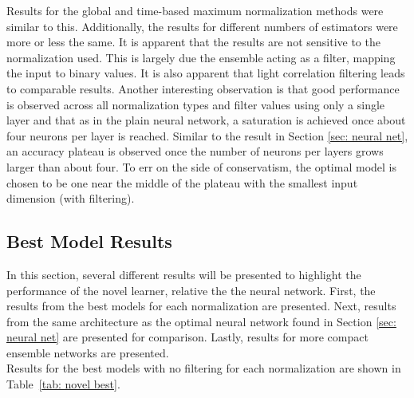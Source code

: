 \documentclass[paper=a4, fontsize=11pt]{scrartcl} %
\begin{document}
Results for the global and time-based maximum normalization methods were similar to this.
Additionally, the results for different numbers of estimators were more or less the same.
It is apparent that the results are not sensitive to the normalization used.
This is largely due the ensemble acting as a filter, mapping the input to binary values.
It is also apparent that light correlation filtering leads to comparable results.
Another interesting observation is that good performance is observed across all normalization types and filter values using only a single layer and that as in the plain neural network, a saturation is achieved once about four neurons per layer is reached.
Similar to the result in Section \ref{sec: neural net}, an accuracy plateau is observed once the number of neurons per layers grows larger than about four.
To err on the side of conservatism, the optimal model is chosen to be one near the middle of the plateau with the smallest input dimension (with filtering).
\\

\subsection*{Best Model Results}

In this section, several different results will be presented to highlight the performance of the novel learner, relative the the neural network.
First, the results from the best models for each normalization are presented.
Next, results from the same architecture as the optimal neural network found in Section \ref{sec: neural net} are presented for comparison.
Lastly, results for more compact ensemble networks are presented.
\\

Results for the best models with no filtering for each normalization are shown in Table~\ref{tab: novel best}.
\end{document}
